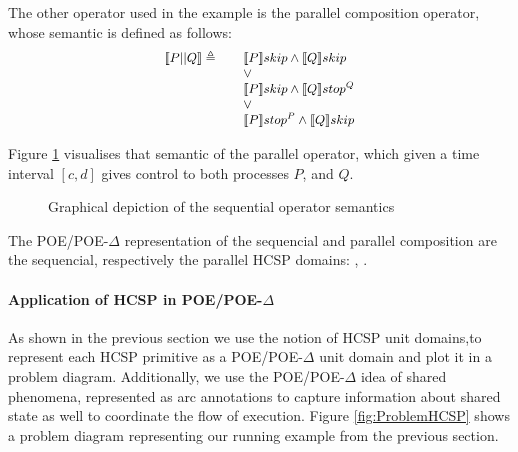 \documentclass[runningheads,a4paper]{llncs}
\begin{document}
The other operator used in the example is the parallel composition
operator, whose semantic is defined as follows:
\[\footnotesize\begin{array}{rcll}
                 \llbracket P || Q \rrbracket  \triangleq && \llbracket P \rrbracket skip \wedge \llbracket Q \rrbracket skip \\
                                                          && \vee \\
                                                          && \llbracket P \rrbracket skip \wedge \llbracket Q \rrbracket {stop}^{Q} \\
                                                          && \vee \\
                                                          && \llbracket P \rrbracket {stop}^{P} \wedge \llbracket Q \rrbracket skip
               \end{array}\]

             Figure \ref{fig:Parallel} visualises that semantic of the
             parallel operator, which given a time interval $[c, d]$
             gives control to both processes $P$, and $Q$.

\begin{figure}[hbt]
  \caption{Graphical depiction of the sequential operator semantics}
  \label{fig:Parallel}
\end{figure}

The POE/POE-$\Delta$ representation of the sequencial and parallel
composition are the sequencial, respectively the parallel HCSP
domains: \mybox{ $\parallel$ }, \mybox{ ; }. 


\paragraph{Application of HCSP in POE/POE-$\Delta$}
As shown in the previous section we use the notion of HCSP unit
domains,to represent each HCSP primitive as a POE/POE-$\Delta$ unit
domain and plot it in a problem diagram. Additionally, we use the
POE/POE-$\Delta$ idea of shared phenomena, represented as arc
annotations to capture information about shared state as well to
coordinate the flow of execution.
Figure \ref{fig:ProblemHCSP} shows a problem diagram representing our
running example from the previous section.
\end{document}
